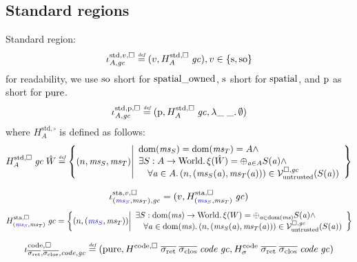 \documentclass[a4paper]{article}
\begin{document}
\subsection{Standard regions}
\label{sec:standard-regions}
Standard region:
\[
  \stdreg{A,\gc}{v} \defeq (v,H_A^{\mathrm{std},\square} \; \gc) , v \in \{\spa,\spao\}
\]
for readability, we use $\spao$ short for $\spatialo$, $\spa$ short for $\spatial$, and $\pur$ as short for $\pure$.
\[
  \stdreg{A,\gc}{\pur} \defeq (\pur,H_A^{\mathrm{std},\square} \; \gc, \lambda \_ \; \_ \ldotp \emptyset)
\]
where $H^{\mathrm{std},\square}_A$ is defined as follows:
\[
  H_A^{\mathrm{std},\square} \; \gc \; \hat{W} \defeq \left\{ \npair{\ms_S,\ms_T} \middle|
    \begin{array}{l}
      \dom(\ms_S) = \dom(\ms_T) = A \wedge \\
      \exists S : A \fun \World \ldotp \xi(\hat{W}) = \oplus_{\aaddr \in A} S(\aaddr) \wedge\\
      \quad \forall \aaddr \in A \ldotp \npair{(\ms_S(\aaddr),\ms_T(\aaddr))} \in \lrv(S(\aaddr))
    \end{array}
  \right\}
\]

\[
  \stareg[\stpair{\ms}{\ms},\gc]{v,\square} = (v,H^\mathrm{sta,\square}_{\stpair{\ms}{\ms}} \; \gc)
\]
\[
  H^\mathrm{sta,\square}_{\stpair{\ms}{\ms}} \; \gc = \left\{ \npair{\stpair{\ms}{\ms}} \middle| 
    \begin{array}{l}
      \exists S : \dom(\ms) \fun \World \ldotp \xi(W) = \oplus_{\aaddr \in \dom(\ms)} S(\aaddr) \wedge\\
      \quad \forall \aaddr \in \dom(\ms) \ldotp \npair{(\ms_S(\aaddr),\ms_T(\aaddr))} \in \lrv(S(\aaddr))
    \end{array}
\right\}
\]


\[
  \codereg{\sigrets,\sigcloss,\code,\gc} \defeq (\pure,
H^\mathrm{code,\square} \; \sigrets \; \sigcloss \; \code \; \gc,
H^\mathrm{code}_\sigma \; \sigrets \; \sigcloss \; \code \; \gc)
\]
\end{document}
